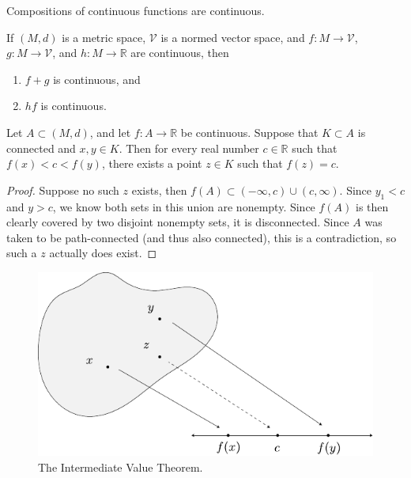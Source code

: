 \documentclass[10pt]{report}
\begin{document}
\begin{prop}
	Compositions of continuous functions are continuous.
\end{prop}

\begin{prop}
	If $(M,d)$ is a metric space, $\mathcal{V}$ is a normed vector space, and $f:M\to \mathcal{V}$, $g:M\to \mathcal{V}$, and $h:M \to \mathbb{R}$ are continuous, then
	\begin{enumerate}
		\item $f+g$ is continuous, and
		\item $hf$ is continuous.
	\end{enumerate}
\end{prop}

\begin{thrm}
	Let $A \subset (M,d)$, and let $f:A \to \mathbb{R}$ be continuous. Suppose that $K \subset A$ is connected and $x,y \in K$. Then for every real number $c \in \mathbb{R}$ such that $f(x) < c < f(y)$, there exists a point $z \in K$ such that $f(z) = c$.
\end{thrm}
\begin{proof}
	Suppose no such $z$ exists, then $f(A) \subset (-\infty,c) \cup (c, \infty)$. Since $y_1 < c$ and $y > c$, we know both sets in this union are nonempty. Since $f(A)$ is then clearly covered by two disjoint nonempty sets, it is disconnected. Since $A$ was taken to be path-connected (and thus also connected), this is a contradiction, so such a $z$ actually does exist.
\end{proof}

\begin{figure}[H]
	\centering
	\includegraphics[scale=0.8]{fig/intermediate-value.pdf}
	\caption{The Intermediate Value Theorem.}
\end{figure}
\end{document}
